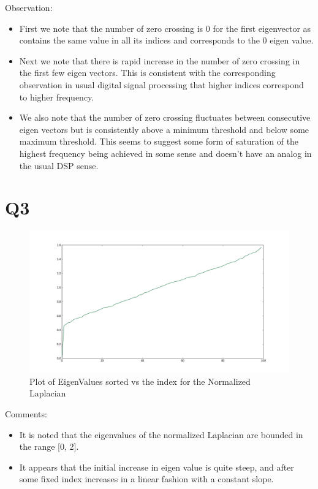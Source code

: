 \documentclass{article}
\begin{document}
Observation:
\begin{itemize}
\item First we note that  the number of zero crossing is 0 for the first eigenvector as contains the same value in all its indices and corresponds to the 0 eigen value.
\item Next we note that there is rapid increase in the number of zero crossing in the first few eigen vectors. This is consistent with the corresponding observation in usual digital signal processing that higher indices correspond to higher frequency.
\item We also note that the number of zero crossing fluctuates between consecutive eigen vectors but is consistently above a minimum threshold and below some maximum threshold. This seems to suggest some form of saturation of the highest frequency being achieved in some sense and doesn't have an analog in the usual DSP sense.
\end{itemize}

\section*{Q3}
\begin{figure}[H]
  \centering
  \includegraphics[scale=0.25]{images/q3_eig_vals}
  \caption{Plot of EigenValues sorted vs the index for the Normalized Laplacian}
  \label{fig:q3}
\end{figure}

Comments:
\begin{itemize}
\item It is noted that the eigenvalues of the normalized Laplacian are bounded in the range [0, 2].
\item It appears that the initial increase in eigen value is quite steep, and after some fixed index increases in a linear fashion with a constant slope.
\end{itemize}
\end{document}
